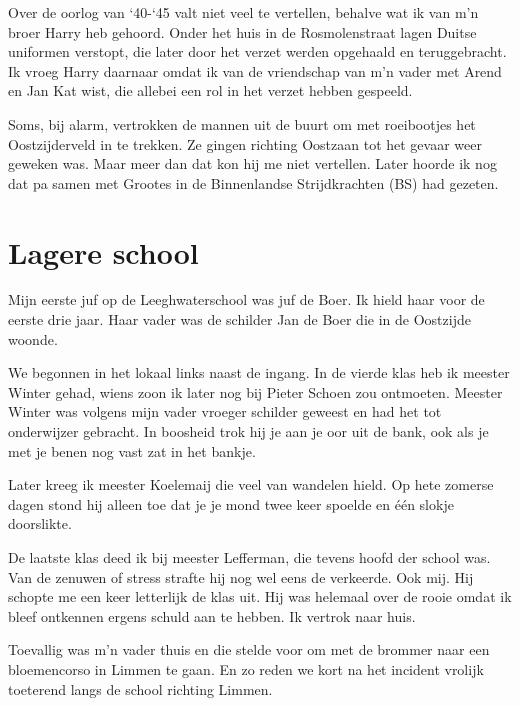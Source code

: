 \documentclass[12pt,twoside]{memoir}
\begin{document}
Over de oorlog van `40-`45 valt niet veel te vertellen, behalve wat ik van m’n broer Harry heb gehoord. Onder het huis in de Rosmolenstraat lagen Duitse uniformen verstopt, die later door het verzet werden opgehaald en teruggebracht. Ik vroeg Harry daarnaar omdat ik van de vriendschap van m’n vader met Arend en Jan Kat wist, die allebei een rol in het verzet hebben gespeeld. 

Soms, bij alarm, vertrokken de mannen uit de buurt om met roeibootjes het Oostzijderveld in te trekken. Ze gingen richting Oostzaan tot het gevaar weer geweken was. Maar meer dan dat kon hij me niet vertellen. Later hoorde ik nog dat pa samen met Grootes in de Binnenlandse Strijdkrachten (BS) had gezeten.

\chapter{Lagere school} %
\label{cha:lagere_school}

Mijn eerste juf op de Leeghwaterschool was juf de Boer. Ik hield haar voor de eerste drie jaar. Haar vader was de schilder Jan de Boer die in de Oostzijde woonde. 

We begonnen in het lokaal links naast de ingang. In de vierde klas heb ik meester Winter gehad, wiens zoon ik later nog bij Pieter Schoen zou ontmoeten. Meester Winter was volgens mijn vader vroeger schilder geweest en had het tot onderwijzer gebracht. In boosheid trok hij je aan je oor uit de bank, ook als je met je benen nog vast zat in het bankje. 

Later kreeg ik meester Koelemaij die veel van wandelen hield. Op hete zomerse dagen stond hij alleen toe dat je je mond twee keer spoelde en één slokje doorslikte. 

De laatste klas deed ik bij meester Lefferman, die tevens hoofd der school was. Van de zenuwen of stress strafte hij nog wel eens de verkeerde. Ook mij. Hij schopte me een keer letterlijk de klas uit. Hij was helemaal over de rooie omdat ik bleef ontkennen ergens schuld aan te hebben. Ik vertrok naar huis. 

Toevallig was m’n vader thuis en die stelde voor om met de brommer naar een bloemencorso in Limmen te gaan. En zo reden we kort na het incident vrolijk toeterend langs de school richting Limmen. 
\end{document}
